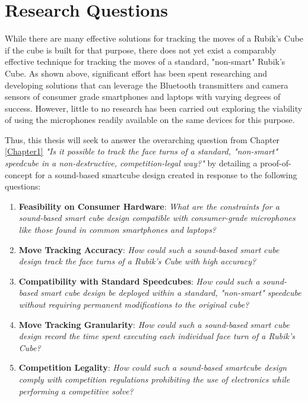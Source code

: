 \section{Research Questions}
\label{sec:research-questions}

While there are many effective solutions for tracking the moves of a
Rubik's Cube if the cube is built for that purpose, there does not yet
exist a comparably effective technique for tracking the moves of a
standard, "non-smart" Rubik's Cube. As shown above, significant effort
has been spent researching and developing solutions that can leverage
the Bluetooth transmitters and camera sensors of consumer grade
smartphones and laptops with varying degrees of success. However,
little to no research has been carried out exploring the viability of
using the microphones readily available on the same devices for this
purpose.

Thus, this thesis will seek to answer the overarching question from
Chapter \ref{Chapter1} \emph{"Is it possible to track the face turns of
a standard, "non-smart" speedcube in a non-destructive,
competition-legal way?"} by detailing a proof-of-concept for a
sound-based smartcube design created in response to the following
questions:

\begin{enumerate}

    \item \textbf{Feasibility on Consumer Hardware}: \emph{What are the
    constraints for a sound-based smart cube design compatible with
    consumer-grade microphones like those found in common smartphones
    and laptops?}
    
    \item \textbf{Move Tracking Accuracy}: \emph{How could such a
    sound-based smart cube design track the face turns of a Rubik's
    Cube with high accuracy?}
    
    \item \textbf{Compatibility with Standard Speedcubes}: \emph{How
    could such a sound-based smart cube design be deployed within a
    standard, "non-smart" speedcube without requiring permanent
    modifications to the original cube?}

    \item \textbf{Move Tracking Granularity}: \emph{How could such a
    sound-based smart cube design record the time spent executing each
    individual face turn of a Rubik's Cube?}
    
    \item \textbf{Competition Legality}: \emph{How could such a
    sound-based smartcube design comply with competition regulations
    prohibiting the use of electronics while performing a competitive
    solve?}
    
\end{enumerate}
